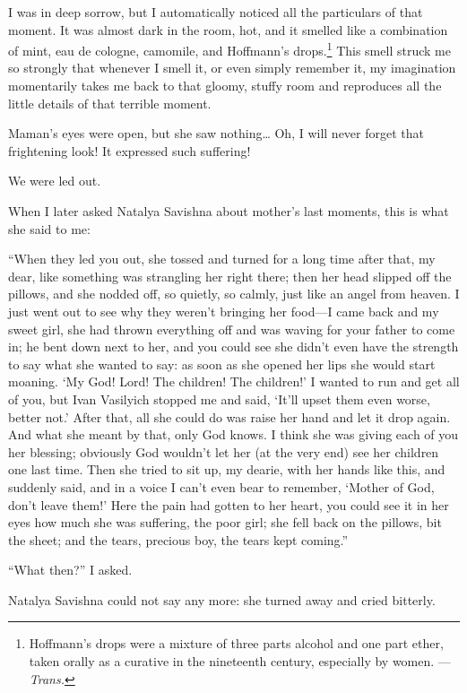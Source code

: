 I was in deep sorrow, but I automatically noticed all the particulars of that moment. It was almost dark in the room, hot, and it smelled like a combination of mint, eau de cologne, camomile, and Hoffmann's drops.\footnote{Hoffmann's drops were a mixture of three parts alcohol and one part ether, taken orally as a curative in the nineteenth century, especially by women. --- \textit{Trans.}} This smell struck me so strongly that whenever I smell it, or even simply remember it, my imagination momentarily takes me back to that gloomy, stuffy room and reproduces all the little details of that terrible moment.

Maman's eyes were open, but she saw nothing\ldots{} Oh, I will never forget that frightening look! It expressed such suffering!

We were led out.

When I later asked Natalya Savishna about mother's last moments, this is what she said to me:

``When they led you out, she tossed and turned for a long time after that, my dear, like something was strangling her right there; then her head slipped off the pillows, and she nodded off, so quietly, so calmly, just like an angel from heaven. I just went out to see why they weren't bringing her food---I came back and my sweet girl, she had thrown everything off and was waving for your father to come in; he bent down next to her, and you could see she didn't even have the strength to say what she wanted to say: as soon as she opened her lips she would start moaning. `My God! Lord! The children! The children!' I wanted to run and get all of you, but Ivan Vasilyich stopped me and said, `It'll upset them even worse, better not.' After that, all she could do was raise her hand and let it drop again. And what she meant by that, only God knows. I think she was giving each of you her blessing; obviously God wouldn't let her (at the very end) see her children one last time. Then she tried to sit up, my dearie, with her hands like this, and suddenly said, and in a voice I can't even bear to remember, `Mother of God, don't leave them!' Here the pain had gotten to her heart, you could see it in her eyes how much she was suffering, the poor girl; she fell back on the pillows, bit the sheet; and the tears, precious boy, the tears kept coming.'' %

``What then?'' I asked.

Natalya Savishna could not say any more: she turned away and cried bitterly.

